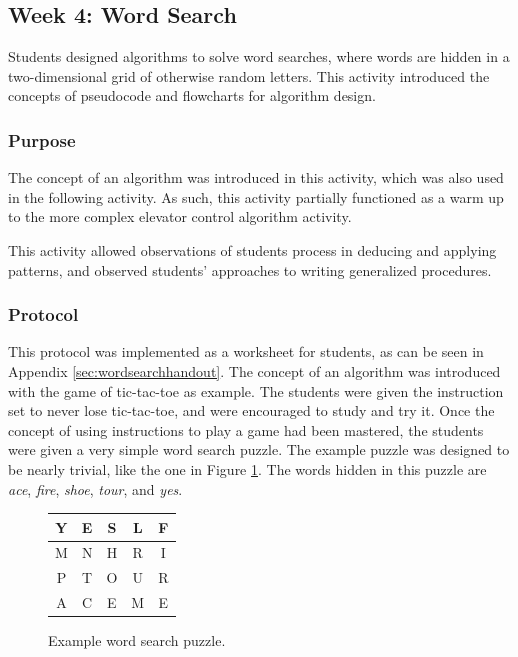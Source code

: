 \subsection{Week 4: Word Search}

	Students designed algorithms to solve word searches, where words
	are hidden in a two-dimensional grid of otherwise random letters.
	This activity introduced the concepts of pseudocode and flowcharts
	for algorithm design.
	
	
	\subsubsection{Purpose}
	
	The concept of an algorithm was introduced in this activity, which
	was also used in the following activity. As such, this activity partially functioned as a warm up to the more complex elevator
	control algorithm activity. 
	
	This activity allowed observations of students process in deducing
	and applying patterns, and observed students' approaches to writing
	generalized procedures.
	
	
	\subsubsection{Protocol}
	
	This protocol was implemented as a worksheet for students, as can
	be seen in Appendix \ref{sec:wordsearchhandout}. The concept of an
	algorithm was introduced with the game of tic-tac-toe as example.
	The students were given the instruction set to never lose tic-tac-toe,
	and were encouraged to study and try it. Once the concept of using
	instructions to play a game had been mastered, the students were
	given a very simple word search puzzle. The example puzzle was
	designed to be nearly trivial, like the one in Figure \ref{fig:Example-word-search}.
	The words hidden in this puzzle are \emph{ace}, \emph{fire}, \emph{shoe},
	\emph{tour}, and \emph{yes}.
	
	\begin{center}
	\begin{figure}
	\begin{centering}
	\begin{tabular}{|c|c|c|c|c|}
	\hline 
	Y & E & S & L & F\tabularnewline
	\hline
	\hline 
	M & N & H & R & I\tabularnewline
	\hline
	\hline 
	P & T & O & U & R\tabularnewline
	\hline
	\hline 
	A & C & E & M & E\tabularnewline
	\hline
	\end{tabular}
	\par\end{centering}
	
	\caption{\label{fig:Example-word-search}Example word search puzzle.}
	
	
	
	\end{figure}
	
	\par\end{center}
	
